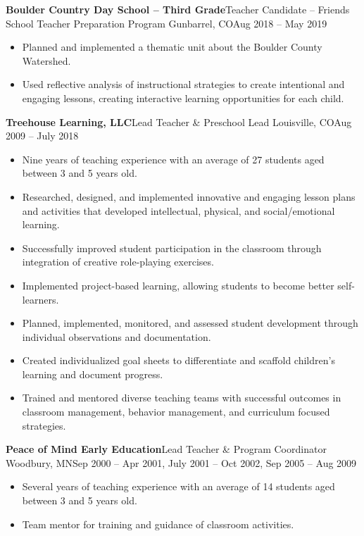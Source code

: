 \documentclass[letterpaper,10pt]{article}
\begin{document}
\vspace{1pc}
\textbf{Boulder Country Day School -- Third Grade}\hfill Teacher Candidate -- Friends School Teacher Preparation Program
\smallbreak Gunbarrel, CO\hfill Aug 2018 -- May 2019

\begin{itemize}
    \item Planned and implemented a thematic unit about the Boulder County Watershed.
    \item Used reflective analysis of instructional strategies to create intentional and engaging lessons, creating interactive learning opportunities for each child.
\end{itemize}


\vspace{1pc}
\textbf{Treehouse Learning, LLC}\hfill Lead Teacher \& Preschool Lead
\smallbreak Louisville, CO\hfill Aug 2009 -- July 2018

\begin{itemize}
    \item Nine years of teaching experience with an average of 27 students aged between 3 and 5 years old.
    \item Researched, designed, and implemented innovative and engaging lesson plans and activities that developed intellectual, physical, and social/emotional learning.
    \item Successfully improved student participation in the classroom through integration of creative role-playing exercises.
    \item Implemented project-based learning, allowing students to become better self-learners.
    \item Planned, implemented, monitored, and assessed student development through individual observations and documentation.
    \item Created individualized goal sheets to differentiate and scaffold children's learning and document progress.
    \item Trained and mentored diverse teaching teams with successful outcomes in classroom management, behavior management, and curriculum focused strategies.
\end{itemize}

\pagebreak
\textbf{Peace of Mind Early Education}\hfill Lead Teacher \& Program Coordinator
\smallbreak Woodbury, MN\hfill Sep 2000 -- Apr 2001, July 2001 -- Oct 2002, Sep 2005 -- Aug 2009

\begin{itemize}
    \item Several years of teaching experience with an average of 14 students aged between 3 and 5 years old.
    \item Team mentor for training and guidance of classroom activities.
\end{itemize}
\end{document}
